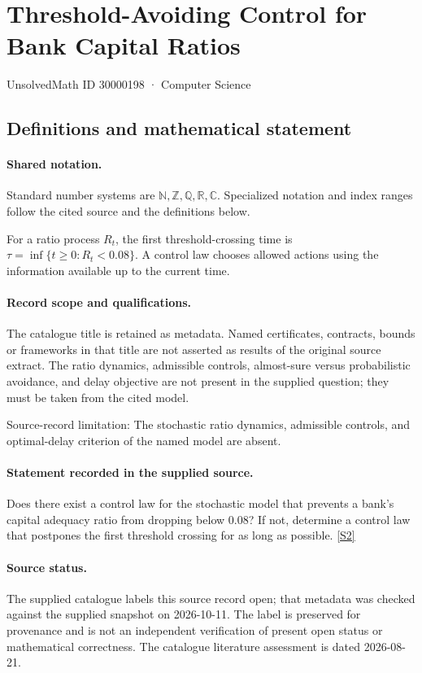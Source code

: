\documentclass[11pt]{article}
\newcommand{\sref}[2]{\hyperlink{source:#1:#2}{[S#2]}}
\begin{document}
\setcounter{section}{30000197}
\section{Threshold-Avoiding Control for Bank Capital Ratios}\label{30000198}
{\small\sffamily UnsolvedMath ID 30000198 · Computer Science}
\subsection{Definitions and mathematical statement}

\paragraph{Shared notation.}Standard number systems are $\mathbb N,\mathbb Z,\mathbb Q,\mathbb R,\mathbb C$. Specialized notation and index ranges follow the cited source and the definitions below.


For a ratio process $R_t$, the first threshold-crossing time is $\tau=\inf\{t\geq0:R_t<0.08\}$. A control law chooses allowed actions using the information available up to the current time.
\paragraph{Record scope and qualifications.}
The catalogue title is retained as metadata. Named certificates, contracts, bounds or frameworks in that title are not asserted as results of the original source extract.
The ratio dynamics, admissible controls, almost-sure versus probabilistic avoidance, and delay objective are not present in the supplied question; they must be taken from the cited model.

Source-record limitation: The stochastic ratio dynamics, admissible controls, and optimal-delay criterion of the named model are absent.
\paragraph{Statement recorded in the supplied source.}
Does there exist a control law for the stochastic model that prevents a bank's capital adequacy ratio from dropping below $0.08$? If not, determine a control law that postpones the first threshold crossing for as long as possible. \sref{30000198}{2}
\paragraph{Source status.}
The supplied catalogue labels this source record open; that metadata was checked against the supplied snapshot on 2026-10-11. The label is preserved for provenance and is not an independent verification of present open status or mathematical correctness. The catalogue literature assessment is dated 2026-08-21.
\end{document}
